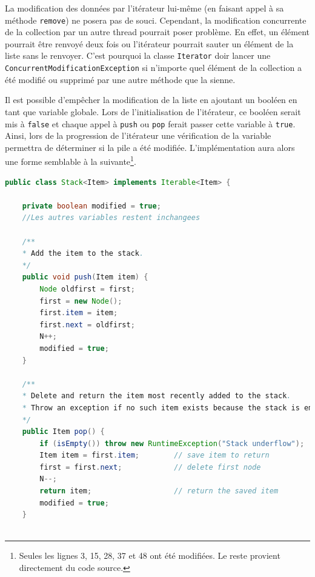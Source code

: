 \begin{enumerate}
	La modification des données par l'itérateur lui-même
        (en faisant appel à sa méthode \lstinline{remove}) ne posera pas
        de souci. Cependant, la modification concurrente de
        la collection par un autre thread pourrait poser problème.
        En effet, un élément pourrait être renvoyé deux fois ou
        l'itérateur pourrait sauter un élément de la liste sans
        le renvoyer. C'est pourquoi la classe \lstinline{Iterator} doir lancer
        une \lstinline{ConcurrentModificationException} si n'importe quel élément
        de la collection a été modifié ou supprimé par une autre
        méthode que la sienne.\cite{iter-openclass}
	 
	Il est possible d'empêcher la modification de la liste en
        ajoutant un booléen en tant que variable globale. Lors de
        l'initialisation de l'itérateur, ce booléen serait mis à
        \lstinline{false} et chaque appel à
        \lstinline{push} ou \lstinline{pop}
        ferait passer cette variable à \lstinline{true}.
        Ainsi, lors de la progression de l'itérateur une vérification
        de la variable permettra de déterminer si la pile a été modifiée.
        L'implémentation aura alors une forme semblable à la
        suivante\footnote{Seules les lignes 3, 15, 28, 37 et 48 ont
        été modifiées. Le reste provient directement du code source.}.
	 
	\begin{lstlisting}[language=Java]
public class Stack<Item> implements Iterable<Item> {
	 
    private boolean modified = true;
    //Les autres variables restent inchangees
	 
    /**
    * Add the item to the stack.
    */
    public void push(Item item) {
        Node oldfirst = first;
        first = new Node();
        first.item = item;
        first.next = oldfirst;
        N++;
        modified = true;
    }
	 
    /**
    * Delete and return the item most recently added to the stack.
    * Throw an exception if no such item exists because the stack is empty.
    */
    public Item pop() {
        if (isEmpty()) throw new RuntimeException("Stack underflow");
        Item item = first.item;        // save item to return
        first = first.next;            // delete first node
        N--;
        return item;                   // return the saved item
        modified = true;
    }
    

\end{lstlisting}
\end{enumerate}

